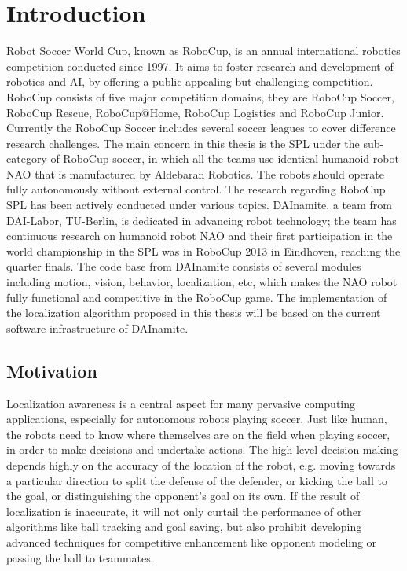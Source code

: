 \chapter{Introduction\label{cha:chapter1}}

Robot Soccer World Cup, known as RoboCup, is an annual international robotics competition conducted since 1997. It aims to foster research and development of robotics and \gls{AI}, by offering a public appealing but challenging competition. RoboCup consists of five major competition domains, they are RoboCup Soccer, RoboCup Rescue, RoboCup@Home, RoboCup Logistics and RoboCup Junior. Currently the RoboCup Soccer includes several soccer leagues to cover difference research challenges. The main concern in this thesis is the \gls{SPL} under the sub-category of RoboCup soccer, in which all the teams use identical humanoid robot NAO that is manufactured by Aldebaran Robotics. The robots should operate fully autonomously without external control. 
The research regarding RoboCup \gls{SPL} has been actively conducted under various topics. DAInamite, a team from DAI-Labor, TU-Berlin, is dedicated in advancing robot technology; the team has continuous research on humanoid robot NAO and their first participation in the world championship in the \gls{SPL} was in RoboCup 2013 in Eindhoven, reaching the quarter finals. The code base from DAInamite consists of several modules including motion, vision, behavior, localization, etc, which makes the NAO robot fully functional and competitive in the RoboCup game.
The implementation of the localization algorithm proposed in this thesis will be based on the current software infrastructure of DAInamite. 

\section{Motivation\label{sec:moti}}
Localization awareness is a central aspect for many pervasive computing applications, especially for autonomous robots playing soccer. Just like human, the robots need to know where themselves are on the field when playing soccer, in order to make decisions and undertake actions. The high level decision making depends highly on the accuracy of the location of the robot, e.g. moving towards a particular direction to split the defense of the defender, or kicking the ball to the goal, or distinguishing the opponent's goal on its own. If the result of localization is inaccurate, it will not only curtail the performance of other algorithms like ball tracking and goal saving, but also prohibit developing advanced techniques for competitive enhancement like opponent modeling or passing the ball to teammates. 

